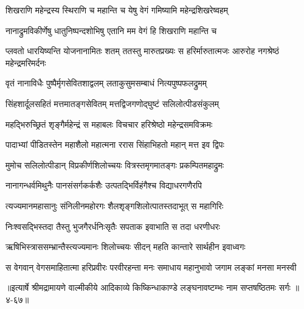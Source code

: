 \twolineshloka
{शिखराणि महेन्द्रस्य स्थिराणि च महान्ति च}
{येषु वेगं गमिष्यामि महेन्द्रशिखरेष्वहम्} %

\twolineshloka
{नानाद्रुमविकीर्णेषु धातुनिष्पन्दशोभिषु}
{एतानि मम वेगं हि शिखराणि महान्ति च} %

\threelineshloka
{प्लवतो धारयिष्यन्ति योजनानामितः शतम्}
{ततस्तु मारुतप्रख्यः स हरिर्मारुतात्मजः}
{आरुरोह नगश्रेष्ठं महेन्द्रमरिमर्दनः} %

\twolineshloka
{वृतं नानाविधैः पुष्पैर्मृगसेवितशाद्वलम्}
{लताकुसुमसम्बाधं नित्यपुष्पफलद्रुमम्} %

\twolineshloka
{सिंहशार्दूलसहितं मत्तमातङ्गसेवितम्}
{मत्तद्विजगणोद्घुष्टं सलिलोत्पीडसंकुलम्} %

\twolineshloka
{महद्भिरुच्छ्रितं शृङ्गैर्महेन्द्रं स महाबलः}
{विचचार हरिश्रेष्ठो महेन्द्रसमविक्रमः} %

\twolineshloka
{पादाभ्यां पीडितस्तेन महाशैलो महात्मना}
{ररास सिंहाभिहतो महान् मत्त इव द्विपः} %

\twolineshloka
{मुमोच सलिलोत्पीडान् विप्रकीर्णशिलोच्चयः}
{वित्रस्तमृगमातङ्गः प्रकम्पितमहाद्रुमः} %

\twolineshloka
{नानागन्धर्वमिथुनैः पानसंसर्गकर्कशैः}
{उत्पतद्भिर्विहंगैश्च विद्याधरगणैरपि} %

\twolineshloka
{त्यज्यमानमहासानुः संनिलीनमहोरगः}
{शैलशृङ्गशिलोत्पातस्तदाभूत् स महागिरिः} %

\twolineshloka
{निःश्वसद्भिस्तदा तैस्तु भुजगैरर्धनिःसृतैः}
{सपताक इवाभाति स तदा धरणीधरः} %

\twolineshloka
{ऋषिभिस्त्राससम्भ्रान्तैस्त्यज्यमानः शिलोच्चयः}
{सीदन् महति कान्तारे सार्थहीन इवाध्वगः} %

\twolineshloka
{स वेगवान् वेगसमाहितात्मा हरिप्रवीरः परवीरहन्ता}
{मनः समाधाय महानुभावो जगाम लङ्कां मनसा मनस्वी} %


॥इत्यार्षे श्रीमद्रामायणे वाल्मीकीये आदिकाव्ये किष्किन्धाकाण्डे लङ्घनावष्टम्भः नाम सप्तषष्ठितमः सर्गः ॥४-६७॥
